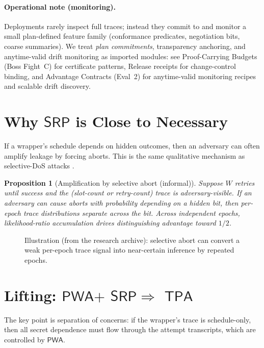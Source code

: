 \documentclass[11pt]{article}
\newtheorem{proposition}{Proposition}
\newcommand{\PWA}{\ensuremath{\mathsf{PWA}}}
\newcommand{\TPA}{\ensuremath{\mathsf{TPA}}}
\newcommand{\SRP}{\ensuremath{\mathsf{SRP}}}
\begin{document}
\paragraph{Operational note (monitoring).}
Deployments rarely inspect full traces; instead they commit to and monitor a small plan-defined feature family (conformance predicates, negotiation bits, coarse summaries).
We treat \emph{plan commitments}, transparency anchoring, and anytime-valid drift monitoring as imported modules: see Proof-Carrying Budgets (Boss Fight~C) for certificate patterns, Release receipts for change-control binding, and Advantage Contracts (Eval~2) for anytime-valid monitoring recipes and scalable drift discovery.\cite{series:proofcarryingbudgets,series:releaseproperty,series:advantagecontracts}

\section{Why \texorpdfstring{\SRP}{SRP} is Close to Necessary}
If a wrapper's schedule depends on hidden outcomes, then an adversary can often amplify leakage by forcing aborts.
This is the same qualitative mechanism as selective-DoS attacks \cite{borisovDanezisMittalCCS2007,dasborisovSelectiveDoS2013}.

\begin{proposition}[Amplification by selective abort (informal)]
Suppose $W$ retries until success and the (slot-count or retry-count) trace is adversary-visible.
If an adversary can cause aborts with probability depending on a hidden bit, then per-epoch trace distributions separate across the bit.
Across independent epochs, likelihood-ratio accumulation drives distinguishing advantage toward $1/2$.
\end{proposition}

\begin{figure}[t]
  \centering
  \caption{Illustration (from the research archive): selective abort can convert a weak per-epoch trace signal into near-certain inference by repeated epochs.}
  \label{fig:abortamp}
\end{figure}

\section{Lifting: \texorpdfstring{\PWA $+$ \SRP $\Rightarrow$ \TPA}{PWA + SRP => TPA}}
The key point is separation of concerns: if the wrapper's trace is schedule-only, then all secret dependence must flow through the attempt transcripts, which are controlled by \PWA.
\end{document}
